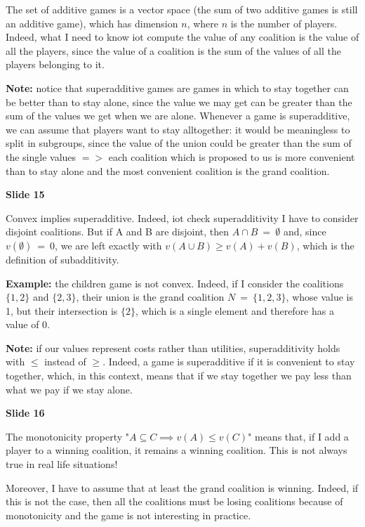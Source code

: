 \noindent The set of additive games is a vector space (the sum of two 
additive games is still an additive game), which has dimension $n$, where $n$ 
is the number of players. Indeed, what I need to know iot compute the value of 
any coalition is the value of all the players, since the value of a coalition 
is the sum of the values of all the players belonging to it.

\noindent \textbf{Note:} notice that superadditive games are games in which 
to stay together can be better than to stay alone, since the value we may 
get can be greater than the sum of the values we get when we are alone. 
Whenever a game is superadditive, we can assume that players want to stay 
alltogether: it would be meaningless to split in subgroups, since the 
value of the union could be greater than the sum of the single values $=>$ 
each coalition which is proposed to us is more convenient than to stay alone 
and the most convenient coalition is the grand coalition.

\bigskip
\noindent \textbf{Slide 15}

\noindent Convex implies superadditive. Indeed, iot check superadditivity I 
have to consider disjoint coalitions. But if A and B are disjoint, then 
$A \cap B~=~\emptyset$ and, since $v(\emptyset)~=~0$, we are left exactly 
with $v(A\cup B) \geq v(A)+v(B)$, which is the definition of subadditivity.

\noindent \textbf{Example:} the children game is not convex. Indeed, if I 
consider the coalitions $\{1,2\}$ and $\{2,3\}$, their union is the grand 
coalition $N~=~\{1,2,3\}$, whose value is 1, but their intersection is $\{2\}$, 
which is a single element and therefore has a value of 0.

\noindent \textbf{Note:} if our values represent costs rather than utilities, 
superadditivity holds with $\leq$ instead of $\geq$. Indeed, a game is 
superadditive if it is convenient to stay together, which, in this context, 
means that if we stay together we pay less than what we pay if we stay alone.

\bigskip
\noindent \textbf{Slide 16}

\noindent The monotonicity property "$A \subseteq C \implies v(A) \leq v(C)$" 
means that, if I add a player to a winning coalition, it remains a winning 
coalition. This is not always true in real life situations!

\noindent Moreover, I have to assume that at least the grand coalition is 
winning. Indeed, if this is not the case, then all the coalitions must be
losing coalitions because of monotonicity and the game is not interesting 
in practice.

